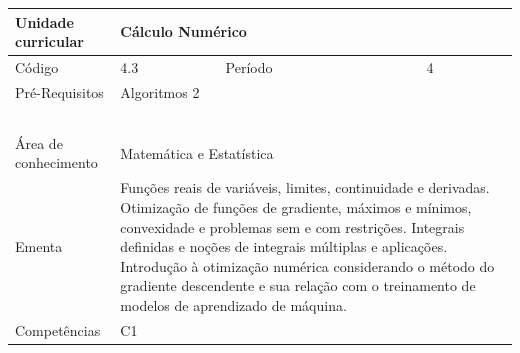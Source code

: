 \clearpage
\newpage

\begin{quadro}[ht!]
  \centering\scriptsize
\caption{Unidade Curricular Cálculo Numérico}

\begin{tabular}{|p{2.5cm}|p{2.5cm}|p{2.5cm}|p{2.5cm}|p{2.5cm}|}\hline

  Unidade curricular & \multicolumn{4}{p{10cm}|}{ Cálculo Numérico }\\\hline
  Código & 4.3 & Período & \multicolumn{2}{p{5cm}|}{ 4 }\\\hline
  Pré-Requisitos & \multicolumn{4}{p{10cm}|}{ Algoritmos 2 } \\\hline
  \cellcolor{blue1}{ CH PRESENCIAL } &
    \cellcolor{blue1}{CH EAD Síncrona} &
    \cellcolor{blue1}{CH EAD Síncrona Mediada} &
    \cellcolor{blue1}{CH EAD Assíncrona} &
    \cellcolor{blue1}{CH APCC} \\\hline
  \cellcolor{blue1}{ 60 } &
    \cellcolor{blue1}{ 0 } &
    \cellcolor{blue1}{ 0 } &
    \cellcolor{blue1}{ 0 } &
    \cellcolor{blue1}{0} \\\hline
  \cellcolor{blue1}{ CH Teórica } &
    \cellcolor{blue1}{CH Prática} &
    \cellcolor{blue1}{CH Humanidades} &
    \cellcolor{blue1}{CH Extensão} &
    \cellcolor{blue1}{CH EAD TOTAL} \\\hline
  \cellcolor{blue1}{ 60 } &
    \cellcolor{blue1}{ 0 } &
    \cellcolor{blue1}{ 0 } &
    \cellcolor{blue1}{ 0 } &
    \cellcolor{blue1}{ 0 } \\\hline
  \cellcolor{blue1}{CARGA-HORÁRIA TOTAL} & \multicolumn{4}{p{10cm}|}{ \cellcolor{blue1}{ 60 } } \\\hline
  Área de conhecimento & \multicolumn{4}{p{10cm}|}{ Matemática e Estatística } \\\hline
  Ementa & \multicolumn{4}{p{10cm}|}{ Funções reais de variáveis, limites, continuidade e derivadas. Otimização de funções de gradiente, máximos e mínimos, convexidade e problemas sem e com restrições. Integrais definidas e noções de integrais múltiplas e aplicações. Introdução à otimização numérica considerando o método do gradiente descendente e sua relação com o treinamento de modelos de aprendizado de máquina. } \\\hline
  Competências & \multicolumn{4}{p{10cm}|}{ C1 } \\\hline


  
	\end{tabular}

\end{quadro}


